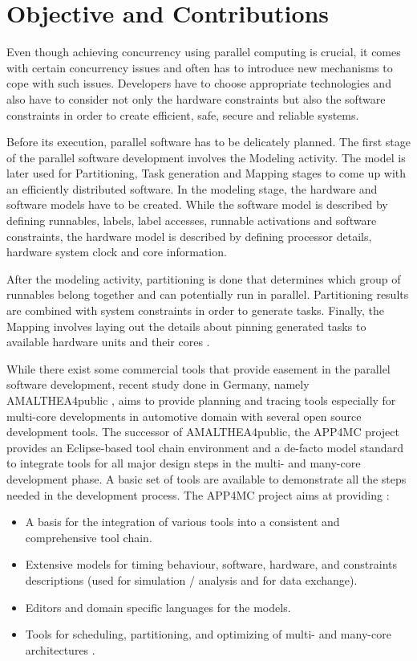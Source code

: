\section{Objective and Contributions}
Even though achieving concurrency using parallel computing is crucial, it comes with certain concurrency issues and often has to introduce new mechanisms to cope with such issues.
Developers have to choose appropriate technologies and also have to consider not only the hardware constraints but also the software constraints in order to create efficient, safe, secure and reliable systems.

Before its execution, parallel software has to be delicately planned. The first stage of the parallel software development involves the Modeling activity. The model is later used for Partitioning, Task generation and Mapping stages to come up with an efficiently distributed software. In the modeling stage, the hardware and software models have to be created. While the software model is described by defining runnables, labels, label accesses, runnable activations and software constraints, the hardware model is described by defining processor details, hardware system clock and core information.

After the modeling activity, partitioning is done that determines which group of runnables belong together and can potentially run in parallel. Partitioning results are combined with system constraints in order to generate tasks. Finally, the Mapping involves laying out the details about pinning generated tasks to available hardware units and their cores \cite{app4mcproposaleclipse}.

While there exist some commercial tools that provide easement in the parallel software development, recent study done in Germany, namely AMALTHEA4public \cite{ICPDSSE} \cite{amalthea4publicweb}, aims to provide planning and tracing tools especially for multi-core developments in automotive domain with several open source development tools. The successor of AMALTHEA4public, the APP4MC project \cite{app4mcproposaleclipse} provides an Eclipse-based tool chain environment and a de-facto model standard to integrate tools for all major design steps in the multi- and many-core development phase. A basic set of tools are available to demonstrate all the steps needed in the development process. The APP4MC project aims at providing \cite{app4mcproposaleclipse}:

\begin{itemize}
	\item A basis for the integration of various tools into a consistent and comprehensive tool chain.
	\item Extensive models for timing behaviour, software, hardware, and constraints descriptions (used for simulation / analysis and for data exchange).
	\item Editors and domain specific languages for the models.
	\item Tools for scheduling, partitioning, and optimizing of multi- and many-core architectures \cite{app4mcproposaleclipse}.
\end{itemize}


